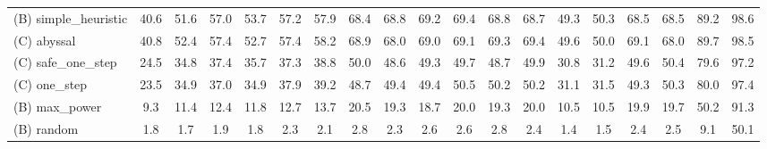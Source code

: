 \begin{table}[htbp]
\begin{adjustbox}{width=\linewidth,center}
\begin{tabular}{lcccccccccccccccccc}
(B) simple\_heuristic & 40.6 & 51.6 & 57.0 & 53.7 & 57.2 & 57.9 & 68.4 & 68.8 & 69.2 & 69.4 & 68.8 & 68.7 & 49.3 & 50.3 & 68.5 & 68.5 & 89.2 & 98.6 \\
(C) abyssal & 40.8 & 52.4 & 57.4 & 52.7 & 57.4 & 58.2 & 68.9 & 68.0 & 69.0 & 69.1 & 69.3 & 69.4 & 49.6 & 50.0 & 69.1 & 68.0 & 89.7 & 98.5 \\
(C) safe\_one\_step & 24.5 & 34.8 & 37.4 & 35.7 & 37.3 & 38.8 & 50.0 & 48.6 & 49.3 & 49.7 & 48.7 & 49.9 & 30.8 & 31.2 & 49.6 & 50.4 & 79.6 & 97.2 \\
(C) one\_step & 23.5 & 34.9 & 37.0 & 34.9 & 37.9 & 39.2 & 48.7 & 49.4 & 49.4 & 50.5 & 50.2 & 50.2 & 31.1 & 31.5 & 49.3 & 50.3 & 80.0 & 97.4 \\
(B) max\_power & 9.3 & 11.4 & 12.4 & 11.8 & 12.7 & 13.7 & 20.5 & 19.3 & 18.7 & 20.0 & 19.3 & 20.0 & 10.5 & 10.5 & 19.9 & 19.7 & 50.2 & 91.3 \\
(B) random & 1.8 & 1.7 & 1.9 & 1.8 & 2.3 & 2.1 & 2.8 & 2.3 & 2.6 & 2.6 & 2.8 & 2.4 & 1.4 & 1.5 & 2.4 & 2.5 & 9.1 & 50.1 \\
\hline
\end{tabular}
\end{adjustbox}
\end{table}
